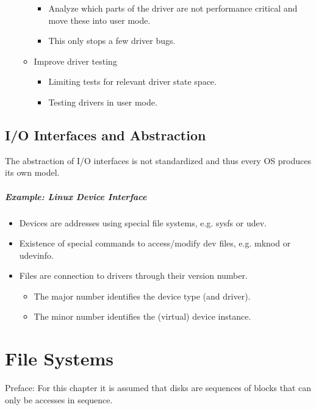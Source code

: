 \begin{itemize}
\begin{itemize}
						\begin{itemize}
							\item Analyze which parts of the driver are not performance critical and move these into user mode.
							\item This only stops a few driver bugs.
						\end{itemize}
					\item Improve driver testing
						\begin{itemize}
							\item Limiting tests for relevant driver state space.
							\item Testing drivers in user mode.
						\end{itemize}
				\end{itemize}
		\end{itemize}

	\section{I/O Interfaces and Abstraction}
		The abstraction of I/O interfaces is not standardized and thus every OS produces its own model.

		\paragraph{Example: Linux Device Interface}
			\begin{itemize}
				\item Devices are addresses using special file systems, e.g. sysfs or udev.
				\item Existence of special commands to access/modify dev files, e.g. mknod or udevinfo.
				\item Files are connection to drivers through their version number.
					\begin{itemize}
						\item The major number identifies the device type (and driver).
						\item The minor number identifies the (virtual) device instance.
					\end{itemize}
			\end{itemize}

\chapter{File Systems}
	Preface: For this chapter it is assumed that disks are sequences of blocks that can only be accesses in sequence.

